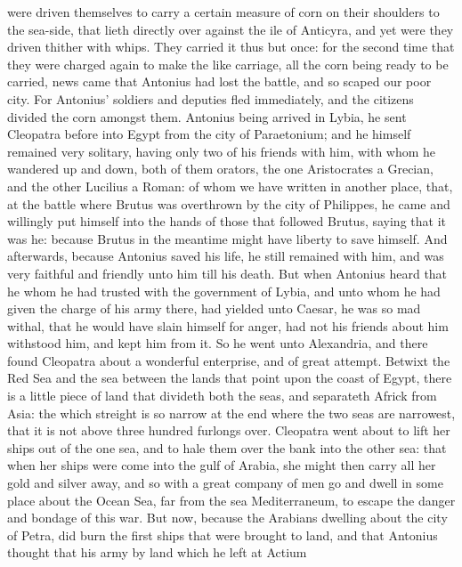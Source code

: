 \documentclass{book}
\begin{document}
were driven themselves to carry a certain measure of corn on their
shoulders to the sea-side, that lieth directly over against the ile of
Anticyra, and yet were they driven thither with whips. They carried
it thus but once: for the second time that they were charged again to
make the like carriage, all the corn being ready to be carried, news
came that Antonius had lost the battle, and so scaped our poor city.
For Antonius' soldiers and deputies fled immediately, and the citizens
divided the corn amongst them. 
Antonius being arrived in Lybia, he sent Cleopatra before into Egypt
from the city of Paraetonium; and he himself remained very solitary,
having only two of his friends with him, with whom he wandered up and
down, both of them orators, the one Aristocrates a Grecian, and the
other Lucilius a Roman: of whom we have written in another place,
 that, at the battle where
Brutus was overthrown by the city of Philippes, he came and willingly
put himself into the hands of those that followed Brutus, saying that
it was he: because Brutus in the meantime might have liberty to save
himself.
And afterwards, because Antonius saved his life, he still remained with
him, and was very faithful  
and friend\-ly unto him till his death. But when Antonius
heard that he whom he had trusted with the government of Lybia, and
unto whom he had given the charge of his army there, had yielded
unto Caesar, he was so mad withal, that he would have slain himself
for anger, had not his friends about him withstood him, and kept him
from it. So  he went unto
Alexandria, and there found Cleopatra about a wonderful enterprise,
and of great attempt. Betwixt the Red Sea and the sea between the
lands that point upon the coast of Egypt, there is a little piece of
land that divideth both the seas, and separateth Africk from Asia:
the which streight is so narrow at the end where the two seas are
narrowest, that it is not above three hundred furlongs over. Cleopatra
went about to lift her ships out of the one sea, and to hale them over
the bank into the other sea: that when her ships were come into the
gulf of Arabia, she might then carry all her gold and silver away, and
so with a great company of men go and dwell in some place about the
Ocean Sea, far from the sea Mediterraneum, to escape the danger and
bondage of this war. But now, because the Arabians dwelling about the
city of Petra, did burn the first ships that were brought to land, and
that Antonius thought that his army by land which he left at Actium
\end{document}
